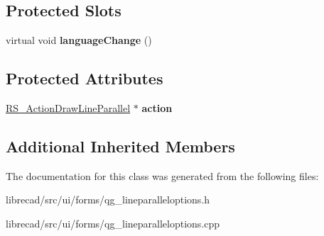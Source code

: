 \subsection*{Protected Slots}
\begin{DoxyCompactItemize}
\item 
\hypertarget{classQG__LineParallelOptions_a8a8883ef04b7fa6b1f5f6bc7f190d2b4}{virtual void {\bfseries language\-Change} ()}\label{classQG__LineParallelOptions_a8a8883ef04b7fa6b1f5f6bc7f190d2b4}

\end{DoxyCompactItemize}
\subsection*{Protected Attributes}
\begin{DoxyCompactItemize}
\item 
\hypertarget{classQG__LineParallelOptions_a389d9e83893437406c6c3aee4f0eb280}{\hyperlink{classRS__ActionDrawLineParallel}{R\-S\-\_\-\-Action\-Draw\-Line\-Parallel} $\ast$ {\bfseries action}}\label{classQG__LineParallelOptions_a389d9e83893437406c6c3aee4f0eb280}

\end{DoxyCompactItemize}
\subsection*{Additional Inherited Members}


The documentation for this class was generated from the following files\-:\begin{DoxyCompactItemize}
\item 
librecad/src/ui/forms/qg\-\_\-lineparalleloptions.\-h\item 
librecad/src/ui/forms/qg\-\_\-lineparalleloptions.\-cpp\end{DoxyCompactItemize}
